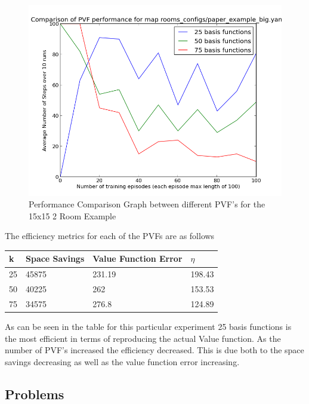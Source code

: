\documentclass[12pt, letterpaper, final]{report}
\begin{document}
\FloatBarrier
\begin{figure}[h!]
\centering
\includegraphics[scale=.5]{images/paper_example_big_comparison_graph02.png}
\caption{Performance Comparison Graph between different PVF's for the
  15x15 2 Room Example}
\label{performanceComparisonGraph1}
\end{figure}
\FloatBarrier

The efficiency metrics for each of the PVFs are as follows

\FloatBarrier
\begin{table}[h!]
  \begin{tabular}{|l|l|l|l|}
  \hline
  {\bf k} & {\bf Space Savings} & {\bf Value Function Error} & $\eta$\\ \hline
  25 & 45875 & 231.19 & 198.43 \\ \hline
  50 & 40225 & 262  & 153.53 \\ \hline
  75 & 34575 &  276.8 & 124.89 \\ \hline
\end{tabular}
\end{table}
\FloatBarrier

As can be seen in the table for this particular experiment 25 basis
functions is the most efficient in terms of reproducing the actual
Value function. As the number of PVF's increased the efficiency
decreased. This is due both to the space savings decreasing as well as
the value function error increasing.

\subsection*{Problems}
\end{document}
